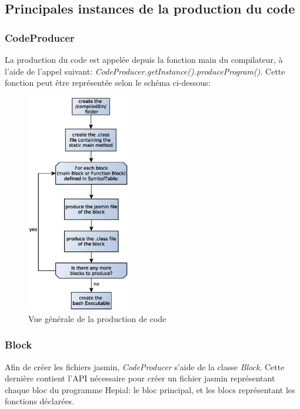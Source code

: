\documentclass[11pt,a4paper]{article}
\begin{document}
  
  
  \subsection{Principales instances de la production du code} 
  
  \subsubsection{CodeProducer}
  
  \par La production du code est appelée depuis la fonction main du compilateur, à l'aide de l'appel suivant: \textit{CodeProducer.getInstance().produceProgram()}. Cette fonction peut être représentée selon le schéma ci-dessous: 
  
  \begin{figure}[h]
    \includegraphics[width=0.4\textwidth,center]{../ressources/CodeProductionOverview.eps}
    \caption{Vue générale de la production de code}
  \end{figure}
  
  \subsubsection{Block}  
  
  \par Afin de créer les fichiers jasmin, \textit{CodeProducer} s'aide de la classe \textit{Block}. Cette dernière contient l'API nécessaire pour créer un fichier jasmin représentant chaque bloc du programme Hepial: le bloc principal, et les blocs représentant les fonctions déclarées. 
  
\end{document}
